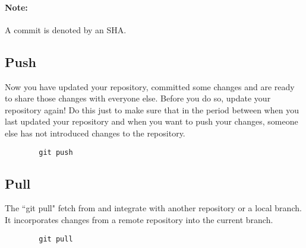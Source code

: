 \documentclass{book}
\begin{document}
    \paragraph{Note:} A commit is denoted by an SHA.

    \subsection*{Push}

    Now you have updated your repository, committed some changes and are ready to share those changes with everyone else. Before you do so, update your repository again! Do this just to make sure that in the period between when you last updated your repository and when you want to push your changes, someone else has not introduced changes to the repository.

    \begin{verbatim}
        git push
    \end{verbatim}

    \subsection*{Pull}
    The ``git pull" fetch from and integrate with another repository or a local branch. It incorporates changes from a remote repository into the current branch.
    \begin{verbatim}
        git pull
    \end{verbatim}
\end{document}
